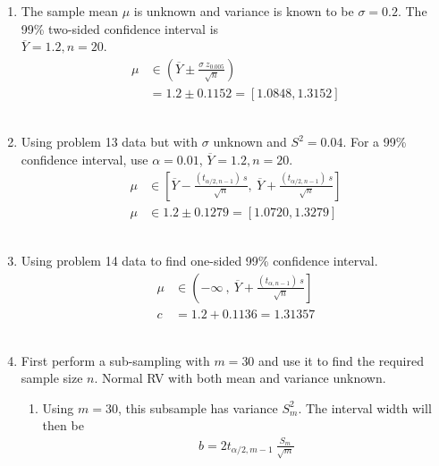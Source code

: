 \begin{enumerate}
	
	\item The sample mean $ \mu $ is unknown and variance is known to be $ \sigma = 0.2 $. The 99\% two-sided confidence interval is \\
	$ \overline{Y} = 1.2, n = 20$. \\
	
		\begin{align}
			\mu &\in \left(\overline{Y} \pm \frac{\sigma\ z_{0.005}}{\sqrt{n}}\right) \nonumber \\
			&= 1.2 \pm 0.1152 = [1.0848, 1.3152] 
		\end{align}\\
	
	
	\item Using problem 13 data but with $ \sigma $ unknown and $ S^2 = 0.04 $. For a 99\% confidence interval, use $ \alpha = 0.01 $, $ \overline{Y} = 1.2, n = 20$. \\
	
		\begin{align}
			\mu &\in \left[ \overline{Y} - \frac{(t_{\alpha/2, n-1})\ s}{\sqrt{n}}, \ \overline{Y} + \frac{(t_{\alpha/2, n-1})\ s}{\sqrt{n}} \right] \nonumber \\
			\mu &\in 1.2 \pm 0.1279 = [1.0720, 1.3279]
		\end{align}\\
	
	
	\item Using problem 14 data to find one-sided 99\% confidence interval. \\
	
		\begin{align}
			\mu &\in \left(-\infty\ , \ \overline{Y} + \frac{(t_{\alpha, n-1})\ s}{\sqrt{n}} \right] \nonumber \\
			c &= 1.2 + 0.1136 = 1.31357
		\end{align}\\
	
	
	\item First perform a sub-sampling with $ m = 30$ and use it to find the required sample size $ n $. Normal RV with both mean and variance unknown. \\
	
		\begin{enumerate}
			\item Using $ m = 30 $, this subsample has variance $ S^2_m $. The interval width will then be\\
			\begin{align}
				b = 2t_{\alpha/2, m-1}\ \frac{S_m}{\sqrt{m}}
			\end{align} \\
			

\end{enumerate}
\end{enumerate}
